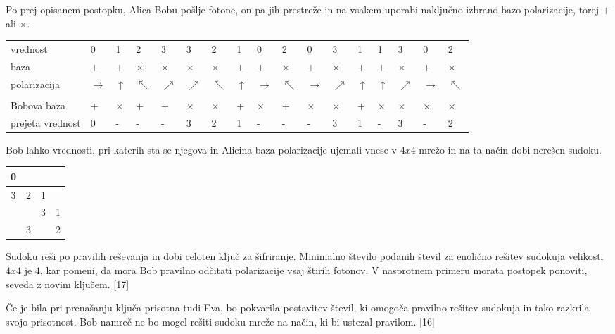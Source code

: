 \documentclass[A4paper, 11pt]{article}
\begin{document}
Po prej opisanem postopku, Alica Bobu pošlje fotone, on pa jih prestreže in na vsakem uporabi naključno izbrano bazo polarizacije, torej $+$ ali $\times$. 

\begin{center}
\begin{tabular}{l m{0.2 cm} m{0.2 cm} m{0.2 cm} m{0.2 cm} m{0.2 cm} m{0.2 cm} m{0.2 cm} m{0.2 cm} m{0.2 cm} m{0.2 cm} m{0.2 cm} m{0.2 cm} m{0.2 cm} m{0.2 cm} m{0.2 cm} m{0.2 cm}}
vrednost & 0 & 1 & 2 & 3 & 3 & 2 & 1 & 0 & 2 & 0 & 3 & 1 & 1 & 3 & 0 & 2\\
baza & + & + & $\times$ & $\times$ & $\times$ & $\times$ & + & + & $\times$ & + & $\times$ & + & + & $\times$ & + & $\times$\\
polarizacija & $\rightarrow$ & $\uparrow$ & $\nwarrow$ & $\nearrow$ & $\nearrow$ & $\nwarrow$ & $\uparrow$ & $\rightarrow$ & $\nwarrow$ & $\rightarrow$ & $\nearrow$ & $\uparrow$ & $\uparrow$ & $\nearrow$ & $\rightarrow$ & $\nwarrow$\\
\\
Bobova baza & + & $\times$ & + & + & $\times$ & $\times$ & + & $\times$ & + & $\times$ & $\times$ & + & $\times$ & $\times$ & $\times$ & $\times$\\
prejeta vrednost & 0 & - & - & - & 3 & 2 & 1 & - & - & - & 3 & 1 & - & 3 & - & 2\\ 
\end{tabular}
\end{center}

Bob lahko vrednosti, pri katerih sta se njegova in Alicina baza polarizacije ujemali vnese v $4x4$ mrežo in na ta način dobi nerešen sudoku.

\begin{center}
\begin{tabular}{| c | c || c | c |}
\hline
0 & & & \\
\hline
3 & 2 & 1 & \\
\hline
\hline
& & 3 & 1\\
\hline
& 3 & & 2\\
\hline
\end{tabular}
\end{center}

Sudoku reši po pravilih reševanja in dobi celoten ključ za šifriranje. Minimalno število podanih števil za enolično rešitev sudokuja velikosti $4x4$ je $4$, kar pomeni, da mora Bob pravilno odčitati polarizacije vsaj štirih fotonov. V nasprotnem primeru morata postopek ponoviti, seveda z novim ključem. [17]

Če je bila pri prenašanju ključa prisotna tudi Eva, bo pokvarila postavitev števil, ki omogoča pravilno rešitev sudokuja in tako razkrila svojo prisotnost. Bob namreč ne bo mogel rešiti sudoku mreže na način, ki bi ustezal pravilom. [16]
\end{document}
